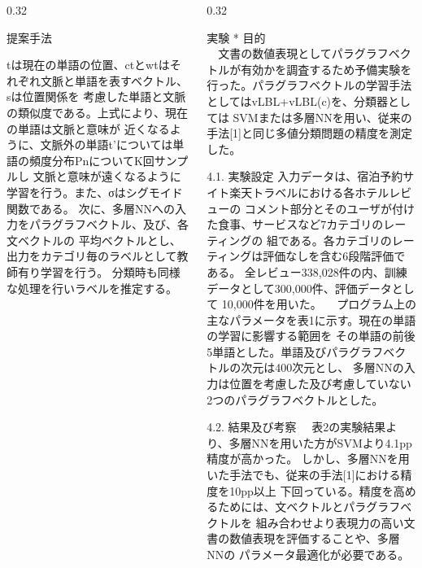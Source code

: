 \documentclass[10pt,unicode]{beamer}
\newcommand{\columnsize}{0.32}
\begin{document}
\begin{frame}{}
\begin{columns}[t]
\begin{column}{\columnsize\textwidth}
\begin{block}{提案手法}

    tは現在の単語の位置、ctとwtはそれぞれ文脈と単語を表すベクトル、sは位置関係を
    考慮した単語と文脈の類似度である。上式により、現在の単語は文脈と意味が
    近くなるように、文脈外の単語t'については単語の頻度分布PnについてK回サンプルし
    文脈と意味が遠くなるように学習を行う。また、σはシグモイド関数である。
    次に、多層NNへの入力をパラグラフベクトル、及び、各文ベクトルの
    平均ベクトルとし、出力をカテゴリ毎のラベルとして教師有り学習を行う。
    分類時も同様な処理を行いラベルを推定する。

  \end{block}
\end{column} %

\begin{column}{\columnsize\textwidth} %
  \begin{block}{実験}
    * 目的 \\
    　文書の数値表現としてパラグラフベクトルが有効かを調査するため予備実験を
    行った。パラグラフベクトルの学習手法としてはvLBL+vLBL(c)を、分類器としては
    SVMまたは多層NNを用い、従来の手法[1]と同じ多値分類問題の精度を測定した。

    4.1. 実験設定
    入力データは、宿泊予約サイト楽天トラベルにおける各ホテルレビューの
    コメント部分とそのユーザが付けた食事、サービスなど7カテゴリのレーティングの
    組である。各カテゴリのレーティングは評価なしを含む6段階評価である。
    全レビュー338,028件の内、訓練データとして300,000件、評価データとして
    10,000件を用いた。
    　プログラム上の主なパラメータを表1に示す。現在の単語の学習に影響する範囲を
    その単語の前後5単語とした。単語及びパラグラフベクトルの次元は400次元とし、
    多層NNの入力は位置を考慮した及び考慮していない2つのパラグラフベクトルとした。

    4.2. 結果及び考察
    　表2の実験結果より、多層NNを用いた方がSVMより4.1pp精度が高かった。
    しかし、多層NNを用いた手法でも、従来の手法[1]における精度を10pp以上
    下回っている。精度を高めるためには、文ベクトルとパラグラフベクトルを
    組み合わせより表現力の高い文書の数値表現を評価することや、多層NNの
    パラメータ最適化が必要である。


\end{block}
\end{column}
\end{columns}
\end{frame}
\end{document}
